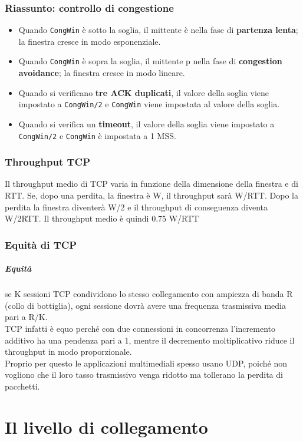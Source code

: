\documentclass{report}
\begin{document}
	\subsection{Riassunto: controllo di congestione}
	\begin{itemize}
		\item Quando \verb|CongWin| è sotto la soglia, il mittente è nella fase di \textbf{partenza lenta}; la finestra cresce in modo esponenziale.
		\item Quando \verb|CongWin| è sopra la soglia, il mittente p nella fase di \textbf{congestion avoidance}; la finestra cresce in modo lineare.
		\item Quando si verificano \textbf{tre ACK duplicati}, il valore della soglia viene impostato a \verb|CongWin/2| e \verb|CongWin| viene impostata al valore della soglia.
		\item Quando si verifica un \textbf{timeout}, il valore della soglia viene impostato a \verb|CongWin/2| e \verb|CongWin| è impostata a 1 MSS.
	\end{itemize}
	\subsection{Throughput TCP}
	Il throughput medio di TCP varia in funzione della dimensione della finestra e di RTT. Se, dopo una perdita, la finestra è W, il throughput sarà W/RTT. Dopo la perdita la finestra diventerà W/2 e il throughput di conseguenza diventa W/2RTT. Il throughput medio è quindi 0.75 W/RTT
	\subsection{Equità di TCP}
	\paragraph{Equità} se K sessioni TCP condividono lo stesso collegamento con ampiezza di banda R (collo di bottiglia), ogni sessione dovrà avere una frequenza trasmissiva media pari a R/K.
	\medskip\\TCP infatti è equo perché con due connessioni in concorrenza l'incremento additivo ha una pendenza pari a 1, mentre il decremento moltiplicativo riduce il throughput in modo proporzionale.
	\medskip\\Proprio per questo le applicazioni multimediali spesso usano UDP, poiché non vogliono che il loro tasso trasmissivo venga ridotto ma tollerano la perdita di pacchetti.
	\chapter{Il livello di collegamento}
	
	
	
	
\end{document}
